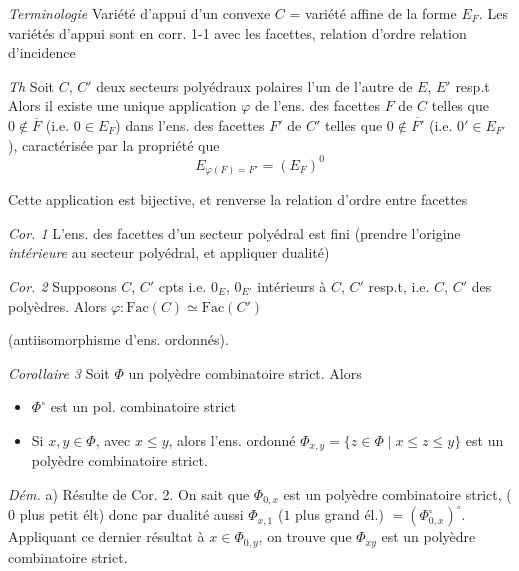 \documentclass[11pt,a4paper]{article}
\begin{document}

\emph{Terminologie} Variété d'appui d'un convexe $C$ = variété affine de la
forme $E_F$. Les variétés d'appui sont en corr. 1-1 avec les facettes,
relation d'ordre  relation d'incidence

\emph{Th} Soit $C$, $C'$ deux secteurs polyédraux polaires l'un de l'autre de
$E$, $E'$ resp.t Alors il existe une unique \struck{\ill{}} application
$\varphi$ de l'ens. des facettes $F$ de $C$ telles que $0 \notin
\overline{F}$ (i.e. $0 \in E_F$) dans l'ens. des facettes $F'$ de $C'$ telles
que $0 \notin \overline{F'}$ (i.e. $0' \in E_{F'}$), caractérisée par la
propriété que 
\[
  E_{\varphi(F) = F'} = (E_F)^{0}
\]

Cette application est bijective, et renverse la relation d'ordre entre
facettes

\emph{Cor. 1} L'ens. des facettes d'un secteur polyédral est fini (prendre
l'origine \emph{intérieure} au secteur polyédral, et appliquer dualité)

\emph{Cor. 2} Supposons $C$, $C'$ cpts \struck{\ill{}} i.e. 
$0_E$, $0_{E'}$ intérieurs à $C$, $C'$ resp.t, i.e. $C$, $C'$ des polyèdres.
Alors $\varphi : \mathrm{Fac}(C) \simeq \mathrm{Fac}(C')$


(antiisomorphisme d'ens. ordonnés).

\emph{Corollaire 3} Soit $\Phi$ un polyèdre combinatoire strict. Alors
\begin{itemize}
  \item[a)] $\Phi^\circ$ est un pol. combinatoire strict
  \item[b)] Si $x, y \in \Phi$, avec $x \leq y$, alors l'ens. ordonné
    $\Phi_{x,y} = \{ z \in \Phi \mid x \leq z \leq y \}$ est un polyèdre
    combinatoire strict.
\end{itemize}

\emph{Dém.} a) Résulte de Cor. 2. On sait que $\Phi_{0,x}$ est un polyèdre
combinatoire strict, ($0$ plus petit élt) donc par dualité aussi $\Phi_{x,1}$
($1$ plus grand él.) $= (\Phi^\circ_{0,x})^\circ$. Appliquant ce dernier
résultat à $x \in \Phi_{0,y}$, on trouve que $\Phi_{xy}$ est un polyèdre
combinatoire strict.

\end{document}
